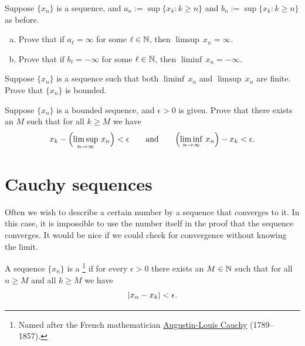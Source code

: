 \begin{exercise}
Suppose $\{ x_n \}$ is a sequence,
and $a_n := \sup \{ x_k : k \geq n \}$ and
$b_n := \sup \{ x_k : k \geq n \}$ as before.
\begin{enumerate}[a)]
\item
Prove that if $a_\ell = \infty$ for some $\ell \in {\mathbb{N}}$, then 
$\limsup\, x_n = \infty$.
\item
Prove that if $b_\ell = -\infty$ for some $\ell \in {\mathbb{N}}$, then 
$\liminf\, x_n = -\infty$.
\end{enumerate}
\end{exercise}

\begin{exercise}
Suppose $\{ x_n \}$ is a sequence
such that both $\liminf\, x_n$ and
$\limsup\, x_n$  are finite.  Prove that $\{ x_n \}$ is bounded.
\end{exercise}

\begin{exercise}
Suppose $\{ x_n \}$ is a bounded sequence, and $\epsilon > 0$ is given.
Prove that there exists an $M$ such that for all $k \geq M$ we have
\begin{equation*}
x_k - \Bigl(\limsup_{n\to\infty}\, x_n\Bigr) < \epsilon \qquad \text{and} \qquad
\Bigl(\liminf_{n\to\infty}\, x_n\Bigr) - x_k < \epsilon .
\end{equation*}
\end{exercise}



\sectionnewpage
\section{Cauchy sequences}
\label{sec:cauchy}


Often we wish to describe a certain number 
by a sequence that converges to it.  In this case, it is impossible to use the
number itself in the proof that the sequence converges.
It would be nice if we could check for convergence without knowing
the limit.

\begin{defn}
A sequence $\{ x_n \}$ is a \emph{}%
\footnote{%
Named after the French mathematician
\href{https://en.wikipedia.org/wiki/Cauchy}{Augustin-Louis Cauchy} (1789--1857).} if
for every $\epsilon > 0$ there exists an $M \in {\mathbb{N}}$ such that
for all $n \geq M$ and all $k \geq M$ we have
\begin{equation*}
\left\lvert {x_n - x_k} \right\rvert < \epsilon .
\end{equation*}
\end{defn}

